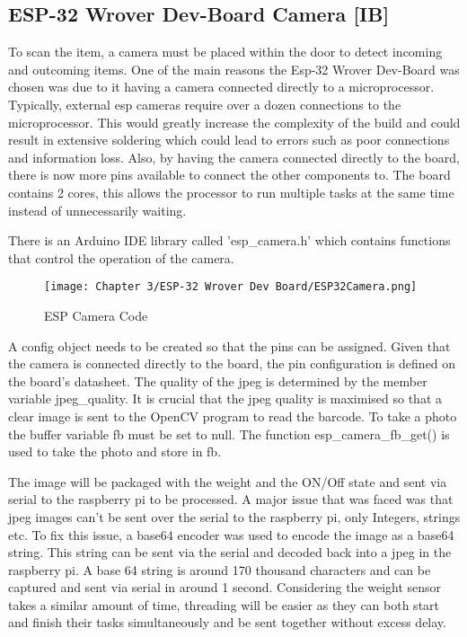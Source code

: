 \subsection{ESP-32 Wrover Dev-Board Camera [IB]}

To scan the item, a camera must be placed within the door to detect incoming and outcoming items.
One of the main reasons the Esp-32 Wrover Dev-Board was chosen was due to it having a camera connected directly to a microprocessor.
Typically, external esp cameras require over a dozen connections to the microprocessor.
This would greatly increase the complexity of the build and could result in extensive soldering which could lead to errors such as poor connections and information loss.
Also, by having the camera connected directly to the board, there is now more pins available to connect the other components to.
The board contains 2 cores, this allows the processor to run multiple tasks at the same time instead of unnecessarily waiting.

There is an Arduino IDE library called 'esp\_camera.h' which contains functions that control the operation of the camera.

\begin{figure}[H]        
    \centering
    \texttt{[image: Chapter 3/ESP-32 Wrover Dev Board/ESP32Camera.png]}
    \caption{ESP Camera Code}
    \label{fig:espcamcode}
\end{figure} 

A config object needs to be created so that the pins can be assigned.
Given that the camera is connected directly to the board, the pin configuration is defined on the board's datasheet.
The quality of the jpeg is determined by the member variable jpeg\_quality.
It is crucial that the jpeg quality is maximised so that a clear image is sent to the OpenCV program to read the barcode.
To take a photo the buffer variable fb must be set to null.
The function esp\_camera\_fb\_get() is used to take the photo and store in fb.

The image will be packaged with the weight and the ON/Off state and sent via serial to the raspberry pi to be processed.
A major issue that was faced was that jpeg images can't be sent over the serial to the raspberry pi, only Integers, strings etc.
To fix this issue, a base64 encoder was used to encode the image as a base64 string.
This string can be sent via the serial and decoded back into a jpeg in the raspberry pi.
A base 64 string is around 170 thousand characters and can be captured and sent via serial in around 1 second.
Considering the weight sensor takes a similar amount of time, threading will be easier as they can both start and finish their tasks simultaneously and be sent together without excess delay.



